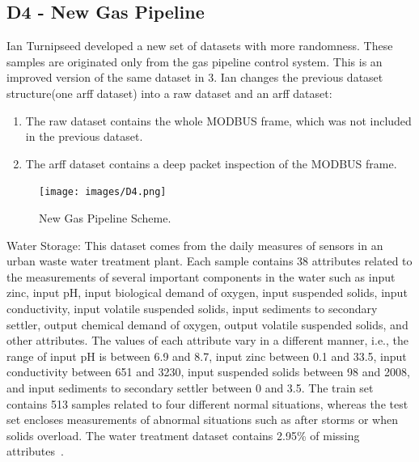 \documentclass[english,12pt]{article}
\begin{document}
\subsection{D4 - New Gas Pipeline} \label{New Gas Pipeline}

Ian Turnipseed developed a new set of datasets with more randomness. These samples are originated only from the gas pipeline control system.
This is an improved version of the same dataset in 3. 
Ian changes the previous dataset structure(one arff dataset) into a raw dataset and an arff dataset:

\begin{enumerate}
  \item The raw dataset contains the whole MODBUS frame, which was not included in the previous dataset.
  \item The arff dataset contains a deep packet inspection of the MODBUS frame.
\end{enumerate}

\begin{figure}[htb]
  \begin{centering}
      \texttt{[image: images/D4.png]}
  \par\end{centering}
  \caption{\label{fig:d4}New Gas Pipeline Scheme.~\cite{IanDefenseSlides}}
\end{figure}

Water Storage:
This dataset comes from the daily measures of sensors in an urban waste water treatment plant. Each sample contains
38 attributes related to the measurements of several important components in the water such as input zinc, input pH,
input biological demand of oxygen, input suspended solids, input conductivity, input volatile suspended solids,
input sediments to secondary settler, output chemical demand of oxygen, output volatile suspended solids, and other
attributes. The values of each attribute vary in a different manner, i.e., the range of input pH is between 6.9 and
8.7, input zinc between 0.1 and 33.5, input conductivity between 651 and 3230, input suspended solids between 98 and
2008, and input sediments to secondary settler between 0 and 3.5. The train set contains 513 samples related to four
different normal situations, whereas the test set encloses measurements of abnormal situations such as after storms
or when solids overload. The water treatment dataset contains 2.95\% of missing attributes~\cite{morris2015industrial}.\\
\end{document}
